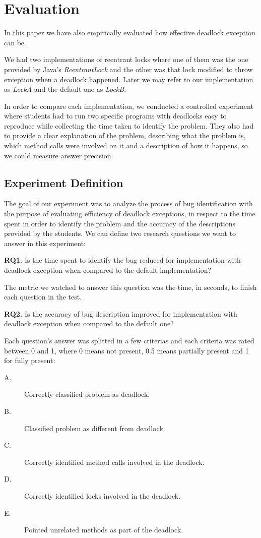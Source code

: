\section{Evaluation}

In this paper we have also empirically evaluated how effective deadlock exception can be.

We had two implementations of reentrant locks where one of them was the one provided by
Java's \emph{ReentrantLock} and the other was that lock modified to throw exception when
a deadlock happened. Later we may refer to our implementation as \emph{LockA} and the default
one as \emph{LockB}.

In order to compare each implementation, we conducted
a controlled experiment where students had to run two specific programs with deadlocks
easy to reproduce while collecting the time taken to identify the problem. They also
had to provide a clear explanation of the problem, describing what the problem is, which method
calls were involved on it and a description of how it happens, so we could measure answer precision.

\subsection{Experiment Definition}

The goal of our experiment was to analyze the process of bug identification with the purpose of evaluating efficiency of deadlock exceptions,
in respect to the time spent in order to identify the problem and the accuracy of the descriptions provided by the students. We can define two
research questions we want to answer in this experiment:

{\bf RQ1.} Is the time spent to identify the bug reduced for implementation with deadlock exception when compared to the default implementation?

The metric we watched to answer this question was the time, in seconds, to finish each question in the test.

{\bf RQ2.} Is the accuracy of bug description improved for implementation with deadlock exception when compared to the default one?

Each question's answer was splitted in a few criterias and each criteria was rated between 0 and 1, where 0 means not present, 0.5 means partially present and 1 for fully present:

\begin{description}
\item[A.] Correctly classified problem as deadlock.
\item[B.] Classified problem as different from deadlock.
\item[C.] Correctly identified method calls involved in the deadlock.
\item[D.] Correctly identified locks involved in the deadlock. 
\item[E.] Pointed unrelated methods as part of the deadlock.
\end{description}

